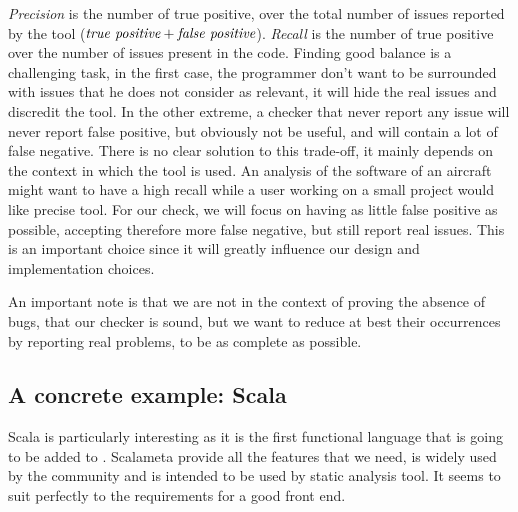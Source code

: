 \emph{Precision} is the number of true positive, over the total number of issues reported by the tool ($ \emph{true positive} + \emph{false positive} $). \emph{Recall} is the number of true positive over the number of issues present in the code. Finding good balance is a challenging task, in the first case, the programmer don’t want to be surrounded with issues that he does not consider as relevant, it will hide the real issues and discredit the tool. In the other extreme, a checker that never report any issue will never report false positive, but obviously not be useful, and will contain a lot of false negative. There is no clear solution to this trade-off, it mainly depends on the context in which the tool is used. An analysis of the software of an aircraft might want to have a high recall while a user working on a small project would like precise tool. For our check, we will focus on having as little false positive as possible, accepting therefore more false negative, but still report real issues. This is an important choice since it will greatly influence our design and implementation choices.

An important note is that we are not in the context of proving the absence of bugs, that our checker is sound, but we want to reduce at best their occurrences by reporting real problems, to be as complete as possible.

\subsection{A concrete example: Scala}
\label{subsec:concrete_example}

Scala is particularly interesting as it is the first functional language that is going to be added to \slang.
Scalameta \cite{Scalameta:2019:Online} provide all the features that we need, is widely used by the community and is intended to be used by static analysis tool. 
It seems to suit perfectly to the requirements for a good front end.


